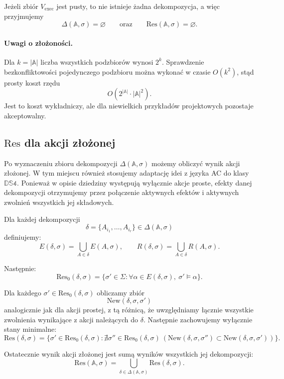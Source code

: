\documentclass[11pt,a4paper]{article}
\theoremstyle{definition}
\begin{document}
Jeżeli zbiór $V_{\mathrm{exec}}$ jest pusty, to nie istnieje żadna dekompozycja, a więc przyjmujemy
\[
\Delta(\mathbb{A},\sigma)=\varnothing
\qquad\text{oraz}\qquad
\mathrm{Res}(\mathbb{A},\sigma)=\varnothing.
\]

\paragraph{Uwagi o złożoności.}
Dla $k=|\mathbb{A}|$ liczba wszystkich podzbiorów wynosi $2^k$. Sprawdzenie bezkonfliktowości pojedynczego podzbioru można wykonać w czasie $O(k^2)$, stąd prosty koszt rzędu
\[
O(2^{|\mathbb{A}|} \cdot |\mathbb{A}|^2).
\]
Jest to koszt wykładniczy, ale dla niewielkich przykładów projektowych pozostaje akceptowalny.

\subsection{\texorpdfstring{$\mathrm{Res}$}{Res} dla akcji złożonej}

Po wyznaczeniu zbioru dekompozycji $\Delta(\mathbb{A},\sigma)$ możemy obliczyć wynik akcji złożonej. W tym miejscu również stosujemy adaptację idei z języka AC do klasy $\mathbb{DS4}$. Ponieważ w opisie dziedziny występują wyłącznie akcje proste, efekty danej dekompozycji otrzymujemy przez połączenie aktywnych efektów i aktywnych zwolnień wszystkich jej składowych.

Dla każdej dekompozycji
\[
\delta = \{A_{i_1},\ldots,A_{i_r}\} \in \Delta(\mathbb{A},\sigma)
\]
definiujemy:
\[
E(\delta,\sigma)=\bigcup_{A \in \delta} E(A,\sigma),
\qquad
R(\delta,\sigma)=\bigcup_{A \in \delta} R(A,\sigma).
\]

Następnie:
\[
\mathrm{Res}_0(\delta,\sigma)=\{\sigma' \in \Sigma : \forall \alpha \in E(\delta,\sigma),\ \sigma' \models \alpha\}.
\]

Dla każdego $\sigma' \in \mathrm{Res}_0(\delta,\sigma)$ obliczamy zbiór
\[
\mathrm{New}(\delta,\sigma,\sigma')
\]
analogicznie jak dla akcji prostej, z tą różnicą, że uwzględniamy łącznie wszystkie zwolnienia wynikające z akcji należących do $\delta$. Następnie zachowujemy wyłącznie stany minimalne:
\[
\mathrm{Res}(\delta,\sigma)=
\{\sigma' \in \mathrm{Res}_0(\delta,\sigma) :
\nexists \sigma'' \in \mathrm{Res}_0(\delta,\sigma)\ 
(\mathrm{New}(\delta,\sigma,\sigma'') \subset \mathrm{New}(\delta,\sigma,\sigma'))\}.
\]

Ostatecznie wynik akcji złożonej jest sumą wyników wszystkich jej dekompozycji:
\[
\mathrm{Res}(\mathbb{A},\sigma)=
\bigcup_{\delta \in \Delta(\mathbb{A},\sigma)} \mathrm{Res}(\delta,\sigma).
\]
\end{document}
